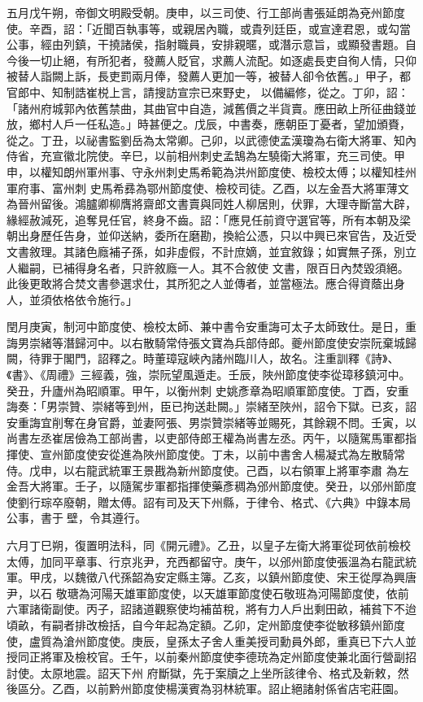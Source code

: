 \begin{pinyinscope}
 五月戊午朔，帝御文明殿受朝。庚申，以三司使、行工部尚書張延朗為兗州節度使。辛酉，詔：「近聞百執事等，或親居內職，或貴列廷臣，或宣達君恩，或勾當公事，經由列鎮，干撓諸侯，指射職員，安排親暱，或潛示意旨，或顯發書題。自今後一切止絕，有所犯者，發薦人貶官，求薦人流配。如逐處長吏自徇人情，只仰被替人詣闕上訴，長吏罰兩月俸，發薦人更加一等，被替人卻令依舊。」甲子，都官郎中、知制誥崔棁上言，請搜訪宣宗已來野史，
 以備編修，從之。丁卯，詔：「諸州府城郭內依舊禁曲，其曲官中自造，減舊價之半貨賣。應田畝上所征曲錢並放，鄉村人戶一任私造。」時甚便之。戊辰，中書奏，應朝臣丁憂者，望加頒賚，從之。丁丑，以祕書監劉岳為太常卿。己卯，以武德使孟漢瓊為右衛大將軍、知內侍省，充宣徽北院使。辛巳，以前相州刺史孟鵠為左驍衛大將軍，充三司使。甲申，以權知朗州軍州事、守永州刺史馬希範為洪州節度使、檢校太傅；以權知桂州軍府事、富州刺
 史馬希彞為鄂州節度使、檢校司徒。乙酉，以左金吾大將軍薄文為晉州留後。鴻臚卿柳膺將齋郎文書賣與同姓人柳居則，伏罪，大理寺斷當大辟，緣經赦減死，追奪見任官，終身不齒。詔：「應見任前資守選官等，所有本朝及梁朝出身歷任告身，並仰送納，委所在磨勘，換給公憑，只以中興已來官告，及近受文書敘理。其諸色廕補子孫，如非虛假，不計庶嫡，並宜敘錄；如實無子孫，別立人繼嗣，已補得身名者，只許敘廕一人。其不合敘使
 文書，限百日內焚毀須絕。此後更敢將合焚文書參選求仕，其所犯之人並傳者，並當極法。應合得資蔭出身人，並須依格依令施行。」



 閏月庚寅，制河中節度使、檢校太師、兼中書令安重誨可太子太師致仕。是日，重誨男崇緒等潛歸河中。以右散騎常侍張文寶為兵部侍郎。夔州節度使安崇阮棄城歸闕，待罪于閣門，詔釋之。時董璋寇峽內諸州臨川人，故名。注重訓釋《詩》、《書》、《周禮》三經義，強，崇阮望風遁走。壬辰，陜州節度使李從璋移鎮河中。癸丑，升廬州為昭順軍。甲午，以衡州刺
 史姚彥章為昭順軍節度使。丁酉，安重誨奏：「男崇贊、崇緒等到州，臣已拘送赴闕。」崇緒至陜州，詔令下獄。已亥，詔安重誨宜削奪在身官爵，並妻阿張、男崇贊崇緒等並賜死，其餘親不問。壬寅，以尚書左丞崔居儉為工部尚書，以吏部侍郎王權為尚書左丞。丙午，以隨駕馬軍都指揮使、宣州節度使安從進為陜州節度使。丁未，以前中書舍人楊凝式為左散騎常侍。戊申，以右龍武統軍王景戡為新州節度使。己酉，以右領軍上將軍李肅
 為左金吾大將軍。壬子，以隨駕步軍都指揮使藥彥稠為邠州節度使。癸丑，以邠州節度使劉行琮卒廢朝，贈太傅。詔有司及天下州縣，于律令、格式、《六典》中錄本局公事，書于壁，令其遵行。



 六月丁巳朔，復置明法科，同《開元禮》。乙丑，以皇子左衛大將軍從珂依前檢校太傅，加同平章事、行京兆尹，充西都留守。庚午，以邠州節度使張溫為右龍武統軍。甲戌，以魏徵八代孫韶為安定縣主簿。乙亥，以鎮州節度使、宋王從厚為興唐尹，以石
 敬瑭為河陽天雄軍節度使，以天雄軍節度使石敬班為河陽節度使，依前六軍諸衛副使。丙子，詔諸道觀察使均補苗稅，將有力人戶出剩田畝，補貧下不迨頃畝，有嗣者排改檢括，自今年起為定額。乙卯，定州節度使李從敏移鎮州節度使，盧質為滄州節度使。庚辰，皇孫太子舍人重美授司勳員外郎，重真已下六人並授同正將軍及檢校官。壬午，以前秦州節度使李德珫為定州節度使兼北面行營副招討使。太原地震。詔天下州
 府斷獄，先于案牘之上坐所該律令、格式及新敕，然後區分。乙酉，以前黔州節度使楊漢賓為羽林統軍。詔止絕諸射係省店宅莊園。




\end{pinyinscope}
